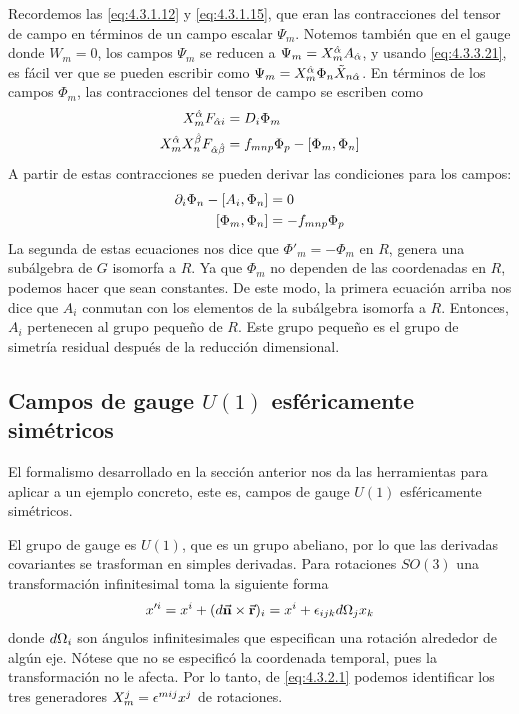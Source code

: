 Recordemos las \eqref{eq:4.3.1.12} y \eqref{eq:4.3.1.15}, que eran las contracciones del tensor de campo en términos de un campo escalar $\Psi_m$. Notemos también que en el gauge donde $W_m=0$, los campos $\Psi_m$ se reducen a $\Psi_m=X^{\hat{\alpha}}_m A_{\hat{\alpha}}$, y usando \eqref{eq:4.3.3.21}, es fácil ver que se pueden escribir como $\Psi_m=X^{\hat{\alpha}}_m\Phi_n\tilde X_{n\hat{\alpha}}$. En términos de los campos $\Phi_m$, las contracciones del tensor de campo se escriben como
\begin{align}
	X^{\hat{\alpha}}_m F_{\hat{\alpha} i} &= D_i\Phi_m \label{eq:4.3.3.22}\\
	X^{\hat{\alpha}}_m X^{\hat{\beta}}_n F_{\hat{\alpha}\hat{\beta}} &= f_{mnp}\Phi_p-[\Phi_m,\Phi_n] \label{eq:4.3.3.23}
\end{align}
A partir de estas contracciones se pueden derivar las condiciones para los campos:
\begin{align}
	\partial_i\Phi_n-[A_i,\Phi_n]&=0 \label{eq:4.3.3.24}\\
	[\Phi_m,\Phi_n] &= -f_{mnp}\Phi_p \label{eq:4.3.3.25}
\end{align}
La segunda de estas ecuaciones nos dice que $\Phi'_m=-\Phi_m$ en $R$, genera una subálgebra de $G$ isomorfa a $R$. Ya que $\Phi_m$ no dependen de las coordenadas en $R$, podemos hacer que sean constantes. De este modo, la primera ecuación arriba nos dice que $A_i$ conmutan con los elementos de la subálgebra isomorfa a $R$. Entonces, $A_i$ pertenecen al grupo pequeño de $R$. Este grupo pequeño es el grupo de simetría residual después de la reducción dimensional.


\subsection{Campos de gauge $U(1)$ esféricamente simétricos}

El formalismo desarrollado en la sección anterior nos da las herramientas para aplicar a un ejemplo concreto, este es, campos de gauge $U(1)$ esféricamente simétricos.

El grupo de gauge es $U(1)$, que es un grupo abeliano, por lo que las derivadas covariantes se trasforman en simples derivadas. Para rotaciones $SO(3)$ una transformación infinitesimal toma la siguiente forma
\begin{align}
	x'^i = x^i+(d\vec{\mathbf{n}}\times \vec{\mathbf{r}})_i = x^i+\epsilon_{ijk}d\Omega_j x_k \label{eq:4.3.2.1}
\end{align}
donde $d\Omega_i$ son ángulos infinitesimales que especifican una rotación alrededor de algún eje. Nótese que no se especificó la coordenada temporal, pues la transformación no le afecta. Por lo tanto, de \eqref{eq:4.3.2.1} podemos identificar los tres generadores $X^j_m=\epsilon^{mij}x^j$ de rotaciones.

